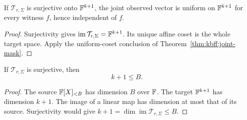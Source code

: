 \begin{corollary}\label{cor:kbff:joint-surjective}
If $\mathcal T_{r,\Sigma}$ is surjective onto $\mathbb{F}^{k+1}$,
the joint observed vector is uniform on $\mathbb{F}^{k+1}$ for every
witness $f$, hence independent of $f$.
\end{corollary}
\begin{proof}
Surjectivity gives $\operatorname{im}\mathcal T_{r,\Sigma}
=\mathbb{F}^{k+1}$. Its unique affine coset is the whole target space.
Apply the uniform-coset conclusion of Theorem~\ref{thm:kbff:joint-mask}.
\end{proof}

\begin{lemma}\label{lem:kbff:rank-obstruction}
If $\mathcal T_{r,\Sigma}$ is surjective, then
\[
 k+1\leq B.
\]
\end{lemma}
\begin{proof}
The source $\mathbb{F}[X]_{<B}$ has dimension $B$ over $\mathbb{F}$.
The target $\mathbb{F}^{k+1}$ has dimension $k+1$.
The image of a linear map has dimension at most that of its source.
Surjectivity would give
$k+1=\dim\operatorname{im}\mathcal T_{r,\Sigma}\leq B$.
\end{proof}

